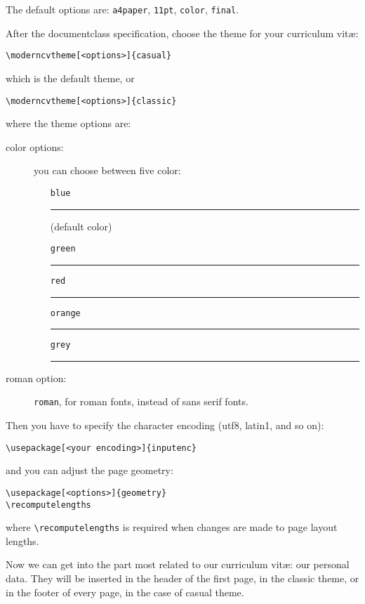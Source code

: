 \documentclass[a4paper,11pt]{article}
\begin{document}
The default options are: \texttt{a4paper}, \texttt{11pt}, \texttt{color}, \texttt{final}. 

After the documentclass specification, choose the theme for your curriculum vit\ae:

\begin{verbatim}
\moderncvtheme[<options>]{casual}
\end{verbatim} 

which is the default theme, or

\begin{verbatim}
\moderncvtheme[<options>]{classic}
\end{verbatim} 

where the theme options are:

\begin{description}
 \item[color options:] you can choose between five color: 
	\begin{itemize}
	 \item[\texttt{blue}] {\color{bluecv}\rule{1cm}{2ex}} (default color)
	 \item[\texttt{green}] {\color{greencv}\rule{1cm}{2ex}}
	 \item[\texttt{red}] {\color{redcv}\rule{1cm}{2ex}}
	 \item[\texttt{orange}] {\color{orangecv}\rule{1cm}{2ex}}
	 \item[\texttt{grey}] {\color{greycv}\rule{1cm}{2ex}}
	\end{itemize}
 \item[roman option:] \texttt{roman}, for {\fontsize{11}{12} \selectfont roman} fonts, instead of \fontsize{11}{12} \selectfont sans serif fonts.
\end{description}

Then you have to specify the character encoding (utf8, latin1, and so on):

\begin{verbatim}
\usepackage[<your encoding>]{inputenc}
\end{verbatim} 

and you can adjust the page geometry:

\begin{verbatim}
\usepackage[<options>]{geometry}
\recomputelengths
\end{verbatim} 

where \verb|\recomputelengths| is required when changes are made to page layout lengths.

Now we can get into the part most related to our curriculum vit\ae: our personal data. They will be inserted in the header of the first page, in the classic theme, or in the footer of every page, in the case of casual theme.
\end{document}

